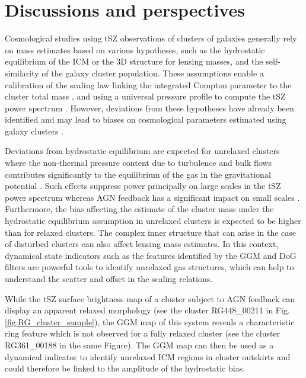 \documentclass[traditabstract]{aa}
\begin{document}
\section{Discussions and perspectives}\label{sec:discussions}
Cosmological studies using tSZ observations of clusters of galaxies generally rely on mass estimates based on various hypotheses, such as the hydrostatic equilibrium of the ICM or the 3D structure for lensing masses, and the self-similarity of the galaxy cluster population. These assumptions enable a calibration of the scaling law linking the integrated Compton parameter to the cluster total mass \citep[see, e.g,][]{Arnaud2007,Arnaud2010,Planck2013V}, and using a universal pressure profile to compute the tSZ power spectrum \citep[e.g.,][]{Komatsu2002}. However, deviations from these hypotheses have already been identified and may lead to biases on cosmological parameters estimated using galaxy clusters \citep[see, e.g.,][]{Ichikawa2013,McDonald2014,Planck2014XX,Planck2015XXIV,Planck2016XXII}.

Deviations from hydrostatic equilibrium are expected for unrelaxed clusters where the non-thermal pressure content due to turbulence and bulk flows contributes significantly to the equilibrium of the gas in the gravitational potential \citep[e.g.,][]{Siegel2016}. Such effects suppress power principally on large scales in the tSZ power spectrum whereas AGN feedback has a significant impact on small scales \citep[e.g.,][]{Shaw2010}. Furthermore, the bias affecting the estimate of the cluster mass under the hydrostatic equilibrium assumption in unrelaxed clusters is expected to be higher than for relaxed clusters. The complex inner structure that can arise in the case of disturbed clusters can also affect lensing mass estimates. In this context, dynamical state indicators such as the features identified by the GGM and DoG filters are powerful tools to identify unrelaxed gas structures, which can help to understand the scatter and offset in the scaling relations.

While the tSZ surface brightness map of a cluster subject to AGN feedback can display an apparent relaxed morphology (see the cluster RG448\_00211 in Fig. \ref{fig:RG_cluster_sample}), the GGM map of this system reveals a characteristic ring feature which is not observed for a fully relaxed cluster (see the cluster RG361\_00188 in the same Figure). The GGM map can then be used as a dynamical indicator to identify unrelaxed ICM regions in cluster outskirts and could therefore be linked to the amplitude of the hydrostatic bias.
\end{document}
